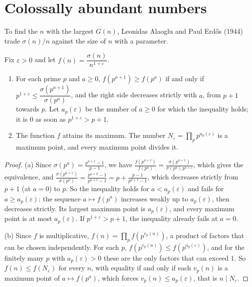 \section{Colossally abundant numbers}

To find the $n$ with the largest $G(n)$, Leonidas Alaoglu and Paul Erd\H{o}s (1944) trade $\sigma(n)/n$ against the size of $n$ with a parameter.

\begin{proposition}\label{prop:ca}
Fix $\varepsilon>0$ and let $f(n)=\dfrac{\sigma(n)}{n^{1+\varepsilon}}$.
\begin{enumerate}[label=(\alph*)]
\item For each prime $p$ and $a\ge0$, $f(p^{a+1})\ge f(p^a)$ if and only if $p^{1+\varepsilon}\le\dfrac{\sigma(p^{a+1})}{\sigma(p^a)}$, and the right side decreases strictly with
$a$, from $p+1$ towards $p$. Let $a_p(\varepsilon)$ be the number of $a\ge0$ for which the inequality holds; it is $0$ as soon as $p^{1+\varepsilon}>p+1$.
\item The function $f$ attains its maximum. The number $N_\varepsilon=\prod_pp^{a_p(\varepsilon)}$ is a maximum point, and every maximum point divides it.
\end{enumerate}
\end{proposition}
\begin{proof}
(a) Since $\sigma(p^a)=\frac{p^{a+1}-1}{p-1}$, we have $\frac{f(p^{a+1})}{f(p^a)}=\frac{\sigma(p^{a+1})}{\sigma(p^a)\,p^{1+\varepsilon}}$, which gives the equivalence, and
$\frac{\sigma(p^{a+1})}{\sigma(p^a)}=\frac{p^{a+2}-1}{p^{a+1}-1}=p+\frac{p-1}{p^{a+1}-1}$, which decreases strictly from $p+1$ (at $a=0$) to $p$. So the inequality
holds for $a<a_p(\varepsilon)$ and fails for $a\ge a_p(\varepsilon)$: the sequence $a\mapsto f(p^a)$ increases weakly up to $a_p(\varepsilon)$, then decreases strictly. Its
largest maximum point is $a_p(\varepsilon)$, and every maximum point is at most $a_p(\varepsilon)$. If $p^{1+\varepsilon}>p+1$, the inequality already fails at $a=0$.

(b) Since $f$ is multiplicative, $f(n)=\prod_pf(p^{v_p(n)})$, a product of factors that can be chosen independently. For each $p$, $f(p^{v_p(n)})\le f(p^{a_p(\varepsilon)})$,
and for the finitely many $p$ with $a_p(\varepsilon)>0$ these are the only factors that can exceed $1$. So $f(n)\le f(N_\varepsilon)$ for every $n$, with equality if
and only if each $v_p(n)$ is a maximum point of $a\mapsto f(p^a)$, which forces $v_p(n)\le a_p(\varepsilon)$, that is $n\mid N_\varepsilon$.
\end{proof}

